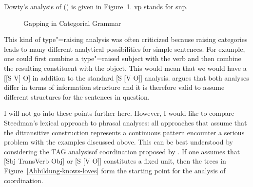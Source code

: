 \begin{exe}
\begin{xlist}[iv.]
\begin{exe}
\begin{xlist}[iv.]
\noindent
Dowty's analysis of () is given in Figure~\ref{Abb-CG-Gapping}. vp stands for s\bs np.
\begin{figure}%
\caption{\label{Abb-CG-Gapping}Gapping in Categorial Grammar}
\end{figure}%

This kind of type"=raising analysis was often criticized because raising categories leads to many different analytical possibilities
for simple sentences. For example, one could first combine a type"=raised subject with the verb and then combine the resulting constituent
with the object. This would mean that we would have a [[S V]
O] in addition to the standard [S [V O]] analysis.
\citet{Steedman91a} argues that both analyses differ in terms of information structure and it is therefore valid to assume different structures
for the sentences in question.

I will not go into these points further here. However, I would like to compare Steedman's lexical approach to phrasal analyses: all approaches
that assume that the ditransitive construction represents a continuous pattern encounter a serious problem with the examples discussed above. This
can be best understood by considering the TAG analysis\indextag of coordination proposed by \citet{SJ96a}.
If one assumes that [Sbj TransVerb Obj] or [S [V O]] constitutes a fixed unit, then the trees in
Figure~\vref{Abbildung-knows-loves} form the starting point for the analysis of coordination. 


\end{xlist}
\end{exe}
\end{xlist}
\end{exe}
